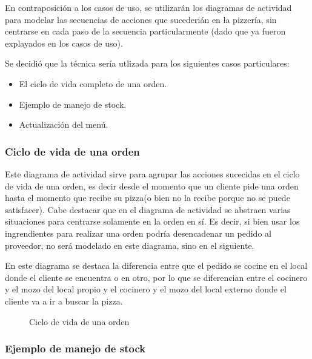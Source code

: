 \documentclass[a4paper,10pt]{article}
\begin{document}
En contraposici\'on a los casos de uso, se utilizar\'an los diagramas de actividad para modelar las secuencias de acciones que sucederi\'an en la 
pizzer\'ia, sin centrarse en cada paso de la secuencia particularmente (dado que ya fueron explayados en los casos de uso).

Se decidi\'o que la t\'ecnica ser\'ia utlizada para los siguientes casos particulares:

\begin{itemize}
\item El ciclo de vida completo de una orden.
\item Ejemplo de manejo de stock.
\item Actualizaci\'on del men\'u.
\end{itemize}


\subsubsection*{Ciclo de vida de una orden}

Este diagrama de actividad sirve para agrupar las acciones sucecidas en el ciclo de vida de una orden, es decir desde el momento que un cliente
pide una orden hasta el momento que recibe su pizza(o bien no la recibe porque no se puede satisfacer). Cabe destacar que en el diagrama de actividad
se abstraen varias situaciones para centrarse solamente en la orden en s\'i. Es decir, si bien usar los ingrendientes para realizar una orden podr\'ia
desencadenar un pedido al proveedor, no ser\'a modelado en este diagrama, sino en el siguiente.

En este diagrama se destaca la diferencia entre que el pedido se cocine en el local donde el cliente se encuentra o en otro, por lo que se 
diferencian entre el cocinero y el mozo del local propio y el cocinero y el mozo del local externo donde el cliente va a ir a buscar la pizza.

\begin{figure}[H]
\centering
{}
\caption{Ciclo de vida de una orden}
\end{figure}

\bigskip

\subsubsection*{Ejemplo de manejo de stock}
\end{document}

